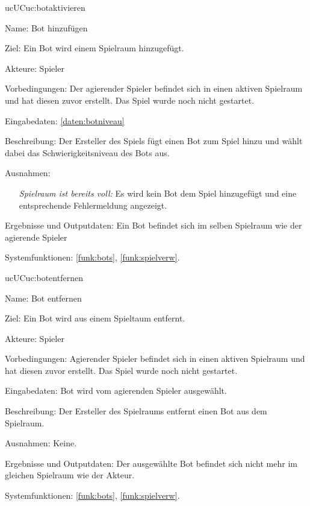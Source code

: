 \begin{description}[leftmargin=5em, style=sameline]
	\begin{lhp}{uc}{UC}{uc:botaktivieren}
		\item [Name:]Bot hinzufügen
		\item [Ziel:]Ein Bot wird einem Spielraum hinzugefügt.
		\item [Akteure:] Spieler
		\item [Vorbedingungen:]Der agierender Spieler befindet sich in einen aktiven Spielraum und hat diesen zuvor erstellt. Das Spiel wurde noch nicht gestartet.
		\item [Eingabedaten:] \ref{daten:botniveau}  
		\item [Beschreibung:]Der Ersteller des Spiels fügt einen Bot zum Spiel hinzu und wählt dabei das Schwierigkeitsniveau des Bots aus. 
		\item [Ausnahmen:]\hfill \begin{itemize} 
		    \item []
		    \textit{Spielraum ist bereits voll:} Es wird kein Bot dem Spiel hinzugefügt und eine entsprechende Fehlermeldung angezeigt.
		\end{itemize}
		\item [Ergebnisse und Outputdaten:]Ein Bot befindet sich im selben Spielraum wie der agierende Spieler
		\item [Systemfunktionen:] 
		\ref{funk:bots}, \ref{funk:spielverw}.
	\end{lhp}
	
	\begin{lhp}{uc}{UC}{uc:botentfernen}
		\item [Name:]Bot entfernen
		\item [Ziel:]Ein Bot wird aus einem Spieltaum entfernt.
		\item [Akteure:] Spieler
		\item [Vorbedingungen:]Agierender Spieler befindet sich in einen aktiven Spielraum und hat diesen zuvor erstellt. Das Spiel wurde noch nicht gestartet.
		\item [Eingabedaten:]Bot wird vom agierenden Spieler ausgewählt.
		\item [Beschreibung:]Der Ersteller des Spielraums entfernt einen Bot aus dem Spielraum. 
		\item [Ausnahmen:]  Keine.
		\item [Ergebnisse und Outputdaten:] Der ausgewählte Bot befindet sich nicht mehr im gleichen Spielraum wie der Akteur.
		\item [Systemfunktionen:] 
		\ref{funk:bots}, \ref{funk:spielverw}.
	\end{lhp}
	

\end{description}
